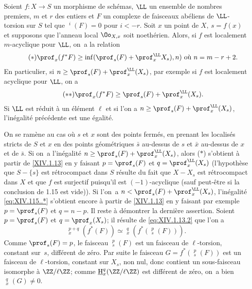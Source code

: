\begin{corollaire} \label{XIV.1.15}
Soient $f:X\to S$ un morphisme de sch\'emas, $\LL$ un ensemble de nombres premiers, $m$ et $r$ des entiers et $F$ un complexe de faisceaux ab\'eliens de $\LL$-torsion sur $S$ tel que $\mathop{\underline{\mathrm{H}}}\nolimits^i(F)=0$ pour $i<-r$. Soit $x$ un point de $X,\ s=f(x)$ et supposons que l'anneau local $\Oo_{X, x}$ soit noeth\'erien. Alors, si $f$ est localement $m$-acyclique pour $\LL$, on~a la relation
\begin{equation*} \label{eq:XIV.115..*} \tag{$*$} {\prof_x(f^*F)\geq\inf(\prof_s(F)+\prof^\LL_xX_s), n)\text{ où }n=m-r+2.}
\end{equation*}
En particulier, si $n\geq\prof_s(F)+\prof_x^\LL(X_s)$, par exemple si $f$ est localement acyclique pour $\LL$, on a
\begin{equation*} \label{eq:XIV.15.**} \tag{$**$} {\prof_x(f^*F)\geq\prof_s(F)+\prof_x^\LL(X_s).}
\end{equation*}
Si $\LL$ est r\'eduit \`a un \'el\'ement $\ell$ et si l'on a $n\geq \prof_s(F)+\prof_x^\LL(X_s)$, l'in\'egalit\'e pr\'ec\'edente est une \'egalit\'e.
\end{corollaire}

On se ram\`ene au cas o\`u $s$ et $x$ sont des points ferm\'es, en prenant les localis\'es stricts de $S$ et $x$ en des points g\'eom\'etriques $\bar s$ au-dessus de $s$ et $\bar x$ au-dessus de $x$ et de $\bar s$. Si on~a l'in\'egalit\'e $n\geq\prof_s(F)+\prof_x^\LL(X_s)$, alors ($*$) s'obtient \`a partir de \ref{XIV.1.13} en y faisant $p=\prof_s(F)$ et $q=\prof_x^\LL(X_s)$ (l'hypoth\`ese que $S-\{s\}$ est r\'etrocompact dans $S$ r\'esulte du fait que $X-X_s$ est r\'etrocompact dans $X$ et que $f$ est surjectif puisqu'il est $(-1)$-acyclique (sauf peut-\^etre si la conclusion de 1.15 est vide)). Si l'on~a $n<\prof_s(F)+\prof_x^\LL(X_s)$, l'in\'egalit\'e \eqref{eq:XIV.115..*} s'obtient encore \`a partir de \ref{XIV.1.13} en y faisant par exemple $p=\prof_s(F)$ et $q=n-p$. Il reste \`a d\'emontrer la derni\`ere assertion. Soient $p=\prof_s(F)$ et $q=\prof_x(X_s)$; il r\'esulte de \eqref{eq:XIV.1.13.2} que l'on a
$$
\mathop{\underline{\mathrm{H}}}\nolimits_x^{p+q}(f^*(F))\simeq \mathop{\underline{\mathrm{H}}}\nolimits_x^q(f^*(\mathop{\underline{\mathrm{H}}}\nolimits^p_s(F))).
$$
Comme $\prof_s(F)=p$, le faisceau $\mathop{\underline{\mathrm{H}}}\nolimits^p_s(F)$ est un faisceau de $\ell$-torsion, constant sur~$s$, diff\'erent de z\'ero. Par suite le faisceau $G=f^*(\mathop{\underline{\mathrm{H}}}\nolimits_s^p(F))$ est un faisceau de $\ell$-torsion, constant sur $X_s$, non nul, donc contient un sous-faisceau isomorphe \`a $\ZZ/\ell\ZZ$; comme $\mathop{\underline{\mathrm{H}}}\nolimits_x^q(\ZZ/\ell\ZZ)$ est diff\'erent de z\'ero, on~a bien $\mathop{\underline{\mathrm{H}}}\nolimits_x^q(G)\neq 0$.

